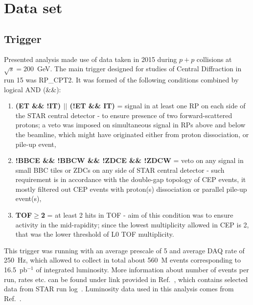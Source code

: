 

\chapter{Data set}\label{chap:dataset}

\section{Trigger}\label{seq:trigger}

Presented analysis made use of data taken in 2015 during $p+p$ collisions at $\sqrt{s}=200$~GeV. The main trigger designed for studies of Central Diffraction in run 15 was RP\_CPT2. It was formed of the following conditions combined by logical AND (\&\&):
\begin{enumerate}
 \item \textbf{(ET \&\& !IT) $||$ (!ET \&\& IT)} = signal in at least one RP on each side of the STAR central detector - to ensure presence of two forward-scattered protons; a veto was imposed on simultaneous signal in RPs above and below the beamline, which might have originated either from proton dissociation, or pile-up event,\\[-15pt]
 \item \textbf{!BBCE \&\& !BBCW \&\& !ZDCE \&\& !ZDCW} = veto on any signal in small BBC tiles or ZDCs on any side of STAR central detector - such requirement is in accordance with the double-gap topology of CEP events, it mostly filtered out CEP events with proton(s) dissociation or parallel pile-up event(s),\\[-15pt]
 \item \textbf{TOF$\geq$2} = at least 2 hits in TOF - aim of this condition was to ensure activity in the mid-rapidity; since the lowest multiplicity allowed in CEP is 2, that was the lower threshold of L0 TOF multiplicity.
\end{enumerate}%
This trigger was running with an average prescale of 5 and average DAQ rate of 250~Hz, which allowed to collect in total about 560~M events corresponding to 16.5~pb$^{-1}$ of integrated luminosity.  More information about number of events per run, rates etc. can be found under link provided in Ref.~\cite{onlineRpTriggersMonitoring}, which contains selected data from STAR run log~\cite{RunLog}. Luminosity data used in this analysis comes from Ref.~\cite{Luminosity}.

